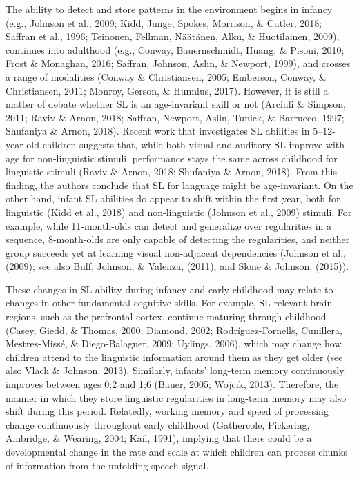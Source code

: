 \documentclass[
  english,
  man,mask,floatsintext]{apa6}
\begin{document}
The ability to detect and store patterns in the environment begins in infancy (e.g., Johnson et al., 2009; Kidd, Junge, Spokes, Morrison, \& Cutler, 2018; Saffran et al., 1996; Teinonen, Fellman, Näätänen, Alku, \& Huotilainen, 2009), continues into adulthood (e.g., Conway, Bauernschmidt, Huang, \& Pisoni, 2010; Frost \& Monaghan, 2016; Saffran, Johnson, Aslin, \& Newport, 1999), and crosses a range of modalities (Conway \& Christiansen, 2005; Emberson, Conway, \& Christiansen, 2011; Monroy, Gerson, \& Hunnius, 2017). However, it is still a matter of debate whether SL is an age-invariant skill or not (Arciuli \& Simpson, 2011; Raviv \& Arnon, 2018; Saffran, Newport, Aslin, Tunick, \& Barrueco, 1997; Shufaniya \& Arnon, 2018). Recent work that investigates SL abilities in 5--12-year-old children suggests that, while both visual and auditory SL improve with age for non-linguistic stimuli, performance stays the same across childhood for linguistic stimuli (Raviv \& Arnon, 2018; Shufaniya \& Arnon, 2018). From this finding, the authors conclude that SL for language might be age-invariant. On the other hand, infant SL abilities do appear to shift within the first year, both for linguistic (Kidd et al., 2018) and non-linguistic (Johnson et al., 2009) stimuli. For example, while 11-month-olds can detect and generalize over regularities in a sequence, 8-month-olds are only capable of detecting the regularities, and neither group succeeds yet at learning visual non-adjacent dependencies (Johnson et al., (2009); see also Bulf, Johnson, \& Valenza, (2011), and Slone \& Johnson, (2015)).

These changes in SL ability during infancy and early childhood may relate to changes in other fundamental cognitive skills. For example, SL-relevant brain regions, such as the prefrontal cortex, continue maturing through childhood (Casey, Giedd, \& Thomas, 2000; Diamond, 2002; Rodríguez-Fornells, Cunillera, Mestres-Missé, \& Diego-Balaguer, 2009; Uylings, 2006), which may change how children attend to the linguistic information around them as they get older (see also Vlach \& Johnson, 2013). Similarly, infants' long-term memory continuously improves between ages 0;2 and 1;6 (Bauer, 2005; Wojcik, 2013). Therefore, the manner in which they store linguistic regularities in long-term memory may also shift during this period. Relatedly, working memory and speed of processing change continuously throughout early childhood (Gathercole, Pickering, Ambridge, \& Wearing, 2004; Kail, 1991), implying that there could be a developmental change in the rate and scale at which children can process chunks of information from the unfolding speech signal.
\end{document}
